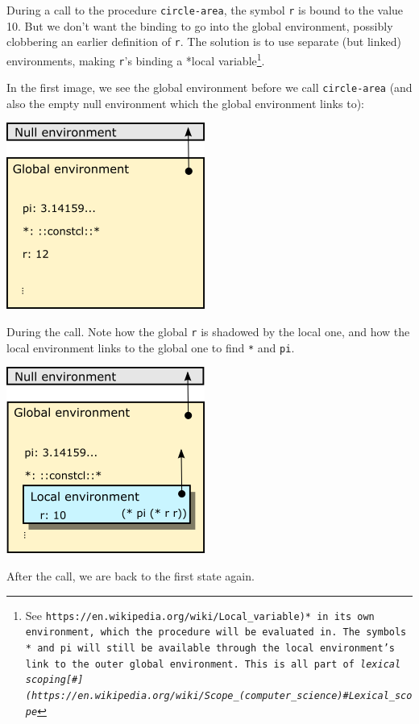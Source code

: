 \documentclass[twoside,9pt]{report}
\begin{document}
During a call to the procedure \texttt{circle-area}, the symbol \texttt{r} is bound to the value 10. But we don't want the binding to go into the global environment, possibly clobbering an earlier definition of \texttt{r}. The solution is to use separate (but linked) environments, making \texttt{r}'s binding a *local variable\footnote{See \texttt{https://en.wikipedia.org/wiki/Local\_variable)* in its own environment, which the procedure will be evaluated in. The symbols \texttt{*} and \texttt{pi} will still be available through the local environment's link to the outer global environment. This is all part of \emph{lexical scoping[\#](https://en.wikipedia.org/wiki/Scope\_(computer\_science)\#Lexical\_scope}}}.


In the first image, we see the global environment before we call \texttt{circle-area} (and also the empty null environment which the global environment links to):


\includegraphics{images/env1.png}


During the call. Note how the global \texttt{r} is shadowed by the local one, and how the local environment links to the global one to find \texttt{*} and \texttt{pi}.


\includegraphics{images/env2.png}


After the call, we are back to the first state again.
\end{document}
